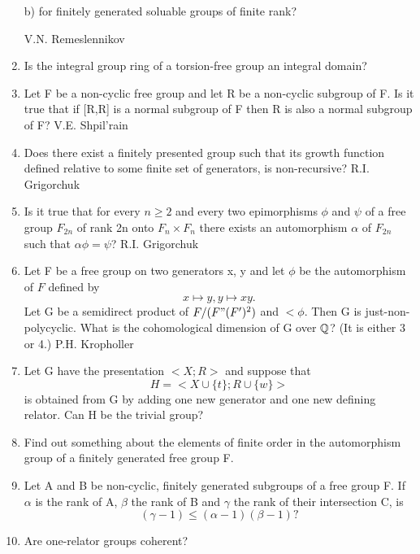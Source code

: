 \begin{enumerate}
\noindent
b) for finitely generated soluable groups of finite rank?

\medskip\noindent
V.N. Remeslennikov


\item Is the integral group ring of a torsion-free group an integral
domain?


\item
Let F be a non-cyclic free group and let R be a non-cyclic subgroup of F.  
Is it true that if [R,R] is a  
normal subgroup of F then R is also a normal subgroup of F?
\medskip\noindent
V.E. Shpil'rain


\item Does there exist a finitely presented group such that 
its growth function defined relative to some  
finite set of generators, is non-recursive?
\medskip\noindent
R.I. Grigorchuk

\item
Is it true that for every $n \geq 2$
and every two epimorphisms $\phi$  and $\psi$
of a free group   $F_{2n}$
of rank   2n  onto  $F_n \times F_n$
there exists an automorphism $\alpha$ of $F_{2n}$                    
such that $\alpha \phi = \psi$?                            
\medskip\noindent
R.I. Grigorchuk

\item Let F be a free group on two generators  x, y and let
$\phi$ be the automorphism of $F$ defined by
$$x \mapsto y, y \mapsto xy.$$
Let G be a semidirect product of $F/(F"(F')^2)$  and $<\phi$.  
Then  G  is just-non-polycyclic.  What is the cohomological dimension 
of  G  over $\Bbb Q$? (It is either 3 or 4.)
\medskip\noindent
P.H. Kropholler       



\item Let G have the presentation $<X;R>$ and suppose that
$$H=<X \cup \{t\};R \cup \{w\}>$$
 is obtained from G by  adding one new generator
and one new defining relator. Can H be the trivial group?

\item
Find out something about the elements of finite
order in the automorphism group of a finitely generated
free group F.

\item Let A and B be non-cyclic, finitely
generated subgroups of a free group F. If $\alpha$ is the rank of A,
$\beta$ the rank of B and $\gamma$ the rank of their intersection C,
is
$$(\gamma - 1) \leq (\alpha -1)(\beta -1)?$$


\item Are one-relator groups coherent?



\end{enumerate}
